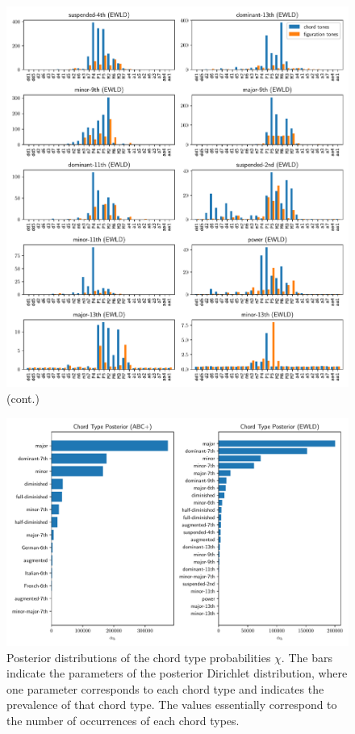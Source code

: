 \documentclass[a4]{scrartcl}
\begin{document}
\begin{figure}\ContinuedFloat
  \centering
  \includegraphics[width=\textwidth]{plots/chordtypes_rest2.pdf}
  \caption[]{(cont.)}
\end{figure}

\begin{figure}[h]
  \centering
  \includegraphics[width=\textwidth]{plots/type_dist.pdf}
  \caption[Posterior distributions of the chord type probabilities $\chi$.]{
    Posterior distributions of the chord type probabilities $\chi$.
    The bars indicate the parameters of the posterior Dirichlet distribution,
    where one parameter corresponds to each chord type and indicates the prevalence of that chord type.
    The values essentially correspond to the number of occurrences of each chord types.
  }
  \label{fig:harmonies-ornaments.post-types}
\end{figure}
\end{document}

